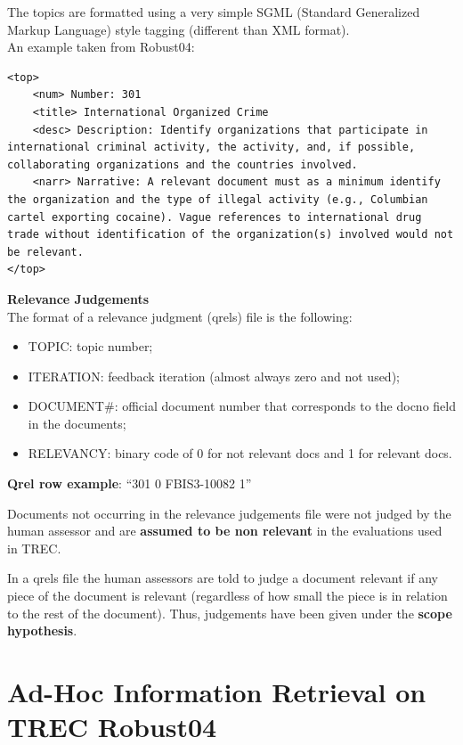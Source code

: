 The topics are formatted using a very simple SGML (Standard Generalized Markup Language) style tagging (different than XML format).\\

An example taken from Robust04:\\

\lstset{language=XML,basicstyle=\ttfamily,breaklines=true}

\begin{lstlisting}
<top>
	<num> Number: 301
	<title> International Organized Crime
	<desc> Description: Identify organizations that participate in international criminal activity, the activity, and, if possible, collaborating organizations and the countries involved.
	<narr> Narrative: A relevant document must as a minimum identify the organization and the type of illegal activity (e.g., Columbian cartel exporting cocaine). Vague references to international drug trade without identification of the organization(s) involved would not be relevant.
</top>
\end{lstlisting}

\textbf{Relevance Judgements}\\

The format of a relevance judgment (qrels) file is the following:

\begin{itemize}
\item TOPIC: topic number;
\item ITERATION: feedback iteration (almost always zero and not used);
\item DOCUMENT\#: official document number that corresponds to the docno field in the documents;
\item RELEVANCY: binary code of 0 for not relevant docs and 1 for relevant docs.
\end{itemize}

\textbf{Qrel row example}: ``301 0 FBIS3-10082 1''

Documents not occurring in the relevance judgements file were not judged by the human assessor and are \textbf{assumed to be non relevant} in the evaluations used in TREC.

In a qrels file the human assessors are told to judge a document relevant if any
piece of the document is relevant (regardless of how small the piece is in
relation to the rest of the document). Thus, judgements have been given under the \textbf{scope hypothesis}.

\section{Ad-Hoc Information Retrieval on TREC Robust04}
\label{sec:leaderboadrobust04}

